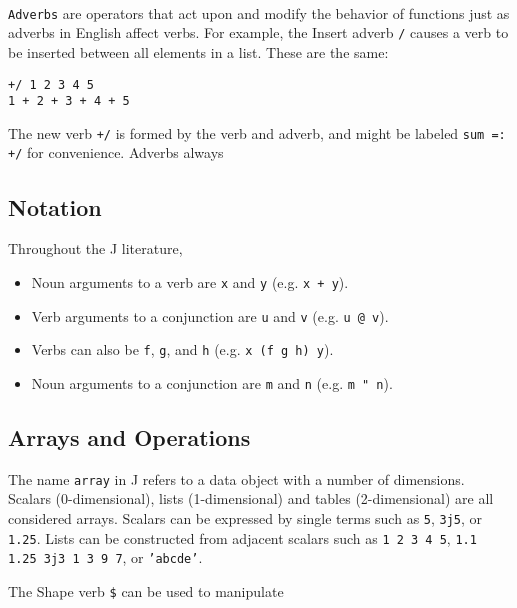 \documentclass[12pt]{article}
\begin{document}
\paragraph{}
\texttt{Adverbs} are operators that act upon and modify the behavior of
functions just as adverbs in English affect verbs. For example, the Insert
adverb \texttt{/} causes a verb to be inserted between all elements in a
list. These are the same:
\begin{verbatim}
+/ 1 2 3 4 5
1 + 2 + 3 + 4 + 5
\end{verbatim}
The new verb \texttt{+/} is formed by the verb and adverb, and might be
labeled \texttt{sum =: +/} for convenience. Adverbs always 




\subsection{Notation}
Throughout the J literature,
\begin{itemize}
\item Noun arguments to a verb are \texttt{x} and \texttt{y}
     (e.g. \texttt{x + y}).
\item Verb arguments to a conjunction are \texttt{u} and \texttt{v}
     (e.g. \texttt{u @ v}).
\item Verbs can also be \texttt{f}, \texttt{g}, and \texttt{h}
     (e.g. \texttt{x (f g h) y}).
\item Noun arguments to a conjunction are \texttt{m} and \texttt{n}
     (e.g. \texttt{m " n}).
\end{itemize}

\subsection{Arrays and Operations}
The name \texttt{array} in J refers to a data object with a number of
dimensions. Scalars (0-dimensional), lists (1-dimensional) and tables
(2-dimensional) are all considered arrays. Scalars can be expressed by
single terms such as \texttt{5}, \texttt{3j5}, or \texttt{1.25}. Lists
can be constructed from adjacent scalars such as \texttt{1 2 3 4 5},
\texttt{1.1 1.25 3j3 1 3 9 7}, or \texttt{'abcde'}. 

The Shape verb \texttt{\$} can be used to manipulate 

\clearpage

\nocite{*}

\end{document}
